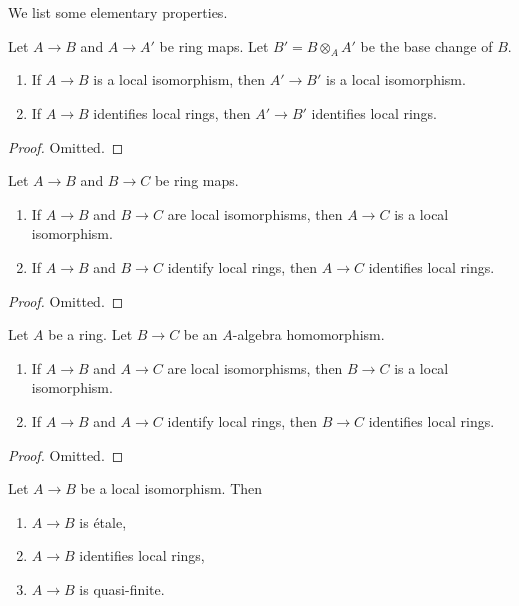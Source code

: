 \noindent
We list some elementary properties.

\begin{lemma}
\label{lemma-base-change-local-isomorphism}
Let $A \to B$ and $A \to A'$ be ring maps. Let $B' = B \otimes_A A'$
be the base change of $B$.
\begin{enumerate}
\item If $A \to B$ is a local isomorphism, then $A' \to B'$ is a
local isomorphism.
\item If $A \to B$ identifies local rings, then $A' \to B'$
identifies local rings.
\end{enumerate}
\end{lemma}

\begin{proof}
Omitted.
\end{proof}

\begin{lemma}
\label{lemma-composition-local-isomorphism}
Let $A \to B$ and $B \to C$ be ring maps.
\begin{enumerate}
\item If $A \to B$ and $B \to C$ are local isomorphisms, then $A \to C$
is a local isomorphism.
\item If $A \to B$ and $B \to C$ identify local rings, then $A \to C$
identifies local rings.
\end{enumerate}
\end{lemma}

\begin{proof}
Omitted.
\end{proof}

\begin{lemma}
\label{lemma-local-isomorphism-permanence}
Let $A$ be a ring. Let $B \to C$ be an $A$-algebra homomorphism.
\begin{enumerate}
\item If $A \to B$ and $A \to C$ are local isomorphisms, then $B \to C$
is a local isomorphism.
\item If $A \to B$ and $A \to C$ identify local rings, then $B \to C$
identifies local rings.
\end{enumerate}
\end{lemma}

\begin{proof}
Omitted.
\end{proof}

\begin{lemma}
\label{lemma-local-isomorphism-implies}
Let $A \to B$ be a local isomorphism. Then
\begin{enumerate}
\item $A \to B$ is \'etale,
\item $A \to B$ identifies local rings,
\item $A \to B$ is quasi-finite.
\end{enumerate}
\end{lemma}

